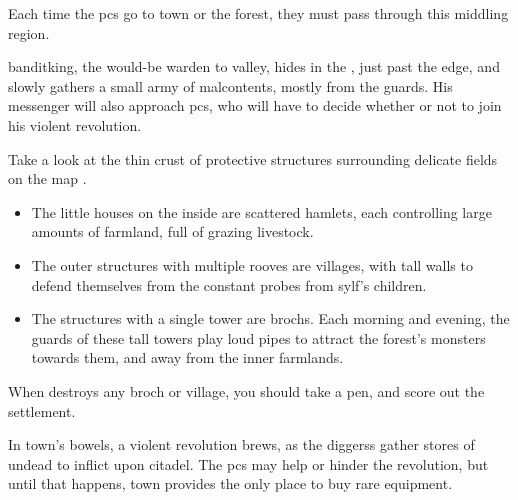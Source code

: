 \label{sqListRoads}

\begin{multicols}{2}
\noindent
Each time the \glspl{pc} go to \gls{town} or the forest, they must pass through this middling \gls{region}.

\Gls{banditking}, the would-be \gls{warden} to \gls{valley}, hides in the , just past the \gls{edge}, and slowly gathers a small army of malcontents, mostly from the \glspl{guard}.
His messenger will also approach \glspl{pc}, who will have to decide whether or not to join his violent revolution.

Take a look at the thin crust of protective structures surrounding delicate fields on the map .

\begin{itemize}
  \item
  The little houses on the inside are scattered hamlets, each controlling large amounts of farmland, full of grazing livestock.
  \item
  The outer structures with multiple rooves are \glspl{village}, with tall walls to defend themselves from the constant probes from \gls{sylf}'s children.
  \item
  The structures with a single tower are \glspl{broch}.
  Each morning and evening, the \glspl{guard} of these tall towers play loud pipes to attract the forest's \glspl{monster} towards them, and away from the inner farmlands.
\end{itemize}

When  destroys any \gls{broch} or \gls{village}, you should take a pen, and score out the settlement.

\end{multicols}


\begin{multicols}{2}
\noindent
In \gls{town}'s bowels, a violent revolution brews, as the \glspl{diggers} gather stores of undead to inflict upon \gls{citadel}.
The \glspl{pc} may help or hinder the revolution, but until that happens, \gls{town} provides the only place to buy rare equipment.

\end{multicols}

\bigLine



